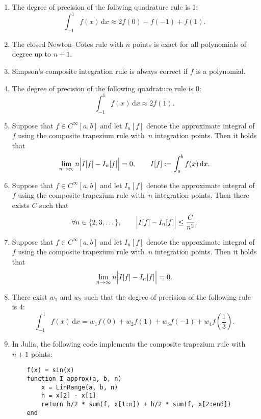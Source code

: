 \documentclass{article}
\renewcommand{\d}{\mathrm d}
\begin{document}
\begin{enumerate}

    \item
        The degree of precision of the follwing quadrature rule is 1:
        \[
            \int_{-1}^{1} f(x) \, \d x
            \approx 2 f(0) - f(-1) + f(1).
        \]

    \item
        The closed Newton--Cotes rule with $n$ points is exact for all polynomials of degree up to $n+1$.

    \item
        Simpson's composite integration rule is always correct if $f$ is a polynomial.

    \item
        The degree of precision of the following quadrature rule is 0:
        \[
            \int_{-1}^1 f(x) \, \d x \approx 2f(1).
        \]

    \item
        Suppose that $f \in C^{\infty}[a, b]$ and let $I_n[f]$ denote the approximate integral of $f$ using the composite trapezium rule
        with~$n$ integration points.
        Then it holds that
        \[
            \lim_{n \to \infty} n \Bigl\lvert I[f] - I_n[f] \Bigr\rvert = 0, \qquad I[f] := \int_{a}^{b} f(x) \, \d x.
        \]

    \item
        Suppose that $f \in C^{\infty}[a, b]$ and let $I_n[f]$ denote the approximate integral of $f$ using the composite trapezium rule
        with~$n$ integration points.
        Then there exists $C$ such that
        \[
             \forall n \in \{2, 3, \dotsc \}, \qquad
             \Bigl\lvert I[f] - I_n[f] \Bigr\rvert \leq \frac{C}{n^2}.
        \]

    \item
        Suppose that $f \in C^{\infty}[a, b]$ and let $I_n[f]$ denote the approximate integral of $f$ using the composite trapezium rule
        with~$n$ integration points.
        Then it holds that
        \[
             \lim_{n \to \infty} n \Bigl\lvert I[f] - I_n[f] \Bigr\rvert = 0.
        \]

    \item
        There exist $w_1$ and $w_2$ such that the degree of precision of the following rule is $4$:
        \[
            \int_{-1}^1 f(x) \, \d x
            = w_1 f(0) + w_2 f(1) + w_3 f(-1) + w_4 f \left( \frac{1}{3} \right).
        \]

    \item
        In Julia, the following code implements the composite trapezium rule with $n+1$ points:
        \begin{verbatim}
    f(x) = sin(x)
    function I_approx(a, b, n)
        x = LinRange(a, b, n)
        h = x[2] - x[1]
        return h/2 * sum(f, x[1:n]) + h/2 * sum(f, x[2:end])
    end
        \end{verbatim}


\end{enumerate}
\end{document}
